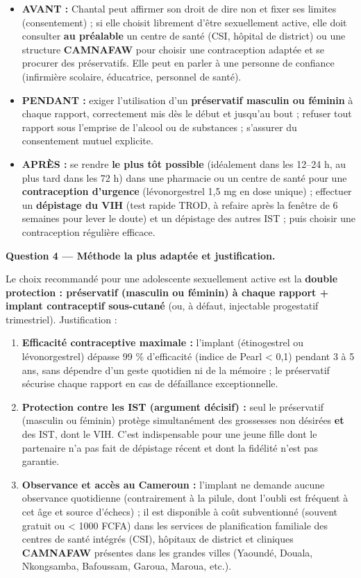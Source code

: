 \documentclass[11pt]{article}
\begin{document}
\begin{exoresolu}
\begin{itemize}
\item \textbf{AVANT :} Chantal peut affirmer son droit de dire non et fixer ses limites (consentement) ; si elle choisit librement d'être sexuellement active, elle doit consulter \textbf{au préalable} un centre de santé (CSI, hôpital de district) ou une structure \textbf{CAMNAFAW} pour choisir une contraception adaptée et se procurer des préservatifs. Elle peut en parler à une personne de confiance (infirmière scolaire, éducatrice, personnel de santé).
\item \textbf{PENDANT :} exiger l'utilisation d'un \textbf{préservatif masculin ou féminin} à chaque rapport, correctement mis dès le début et jusqu'au bout ; refuser tout rapport sous l'emprise de l'alcool ou de substances ; s'assurer du consentement mutuel explicite.
\item \textbf{APRÈS :} se rendre \textbf{le plus tôt possible} (idéalement dans les 12--24 h, au plus tard dans les 72 h) dans une pharmacie ou un centre de santé pour une \textbf{contraception d'urgence} (lévonorgestrel 1,5 mg en dose unique) ; effectuer un \textbf{dépistage du VIH} (test rapide TROD, à refaire après la fenêtre de 6 semaines pour lever le doute) et un dépistage des autres IST ; puis choisir une contraception régulière efficace.
\end{itemize}

\textbf{Question 4 — Méthode la plus adaptée et justification.}

Le choix recommandé pour une adolescente sexuellement active est la \textbf{double protection : préservatif (masculin ou féminin) à chaque rapport + implant contraceptif sous-cutané} (ou, à défaut, injectable progestatif trimestriel). Justification :
\begin{enumerate}
\item \textbf{Efficacité contraceptive maximale :} l'implant (étinogestrel ou lévonorgestrel) dépasse 99 \% d'efficacité (indice de Pearl < 0,1) pendant 3 à 5 ans, sans dépendre d'un geste quotidien ni de la mémoire ; le préservatif sécurise chaque rapport en cas de défaillance exceptionnelle.
\item \textbf{Protection contre les IST (argument décisif) :} seul le préservatif (masculin ou féminin) protège simultanément des grossesses non désirées \textbf{et} des IST, dont le VIH. C'est indispensable pour une jeune fille dont le partenaire n'a pas fait de dépistage récent et dont la fidélité n'est pas garantie.
\item \textbf{Observance et accès au Cameroun :} l'implant ne demande aucune observance quotidienne (contrairement à la pilule, dont l'oubli est fréquent à cet âge et source d'échecs) ; il est disponible à coût subventionné (souvent gratuit ou < 1000 FCFA) dans les services de planification familiale des centres de santé intégrés (CSI), hôpitaux de district et cliniques \textbf{CAMNAFAW} présentes dans les grandes villes (Yaoundé, Douala, Nkongsamba, Bafoussam, Garoua, Maroua, etc.).
\end{enumerate}


\end{exoresolu}
\end{document}

